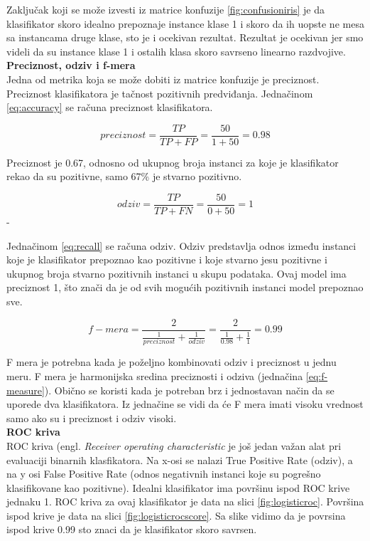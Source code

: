 \documentclass[a4paper,12pt]{report}
\begin{document}
Zaključak koji se može izvesti iz matrice konfuzije \ref{fig:confusioniris} je da klasifikator skoro idealno prepoznaje instance klase 1 i skoro da ih uopste ne mesa sa instancama druge klase, sto je i ocekivan rezultat. Rezultat je ocekivan jer smo videli da su instance klase 1 i ostalih klasa skoro savrseno linearno razdvojive.\\

\textbf{Preciznost, odziv i f-mera}\\

Jedna od metrika koja se može dobiti iz matrice konfuzije je preciznost. Preciznost klasifikatora je tačnost pozitivnih predviđanja. Jednačinom \ref{eq:accuracy} se računa preciznost klasifikatora. 

\begin{equation} \label{eq:accuracy}
	preciznost = \frac{TP}{TP + FP} = \frac{50}{1 + 50} = 0.98
\end{equation}

Preciznost je 0.67, odnosno od ukupnog broja instanci za koje je klasifikator rekao da su pozitivne, samo 67\% je stvarno pozitivno. 

\begin{equation} \label{eq:recall}
	odziv = \frac{TP}{TP + FN} = \frac{50}{0 + 50} = 1
\end{equation}-

Jednačinom \ref{eq:recall} se računa odziv. Odziv predstavlja odnos između instanci koje je klasifikator prepoznao kao pozitivne i koje stvarno jesu pozitivne i ukupnog broja stvarno pozitivnih instanci u skupu podataka. Ovaj model ima preciznost 1, što znači da je od svih mogućih pozitivnih instanci model prepoznao sve.

\begin{equation} \label{eq:f-measure}
	f-mera = \frac{2}{\frac{1}{preciznost} + \frac{1}{odziv}} =  \frac{2}{\frac{1}{0.98} + \frac{1}{1}} = 0.99
\end{equation}

F mera je potrebna kada je poželjno kombinovati odziv i preciznost u jednu meru. F mera je harmonijska sredina preciznosti i odziva (jednačina \ref{eq:f-measure}). Obično se koristi kada je potreban brz i jednostavan način da se uporede dva klasifikatora. Iz jednačine se vidi da će F mera imati visoku vrednost samo ako su i preciznost i odziv visoki. \\

\textbf{ROC kriva}\\

ROC kriva (engl. \textit{Receiver operating characteristic} je još jedan važan alat pri evaluaciji binarnih klasfikatora. Na x-osi se nalazi True Positive Rate (odziv), a na y osi False Positive Rate (odnos negativnih instanci koje su pogrešno klasifikovane kao pozitivne). Idealni klasifikator ima površinu ispod ROC krive jednaku 1. ROC kriva za ovaj klasifikator je data na slici \ref{fig:logisticroc}. Površina ispod krive je data na slici \ref{fig:logisticrocscore}. Sa slike vidimo da je povrsina ispod krive 0.99 sto znaci da je klasifikator skoro savrsen.\\
\end{document}

